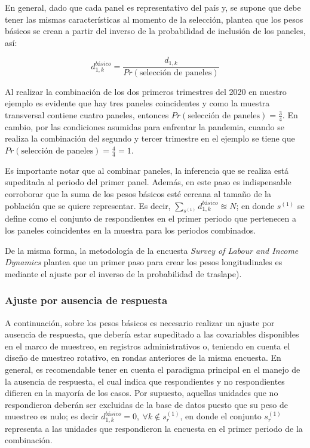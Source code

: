 \documentclass[
  12pt,
]{book}
\begin{document}
En general, dado que cada panel es representativo del país y, se supone que debe tener las mismas características al momento de la selección, \citet{LaRoche_2003} plantea que los pesos básicos se crean a partir del inverso de la probabilidad de inclusión de los paneles, así:

\[
d_{1, k}^{básico} = \frac{d_{1, k}}{Pr(\text{selección de paneles})}
\]

Al realizar la combinación de los dos primeros trimestres del 2020 en nuestro ejemplo es evidente que hay tres paneles coincidentes y como la muestra transversal contiene cuatro paneles, entonces \(Pr(\text{selección de paneles}) = \frac{3}{4}\). En cambio, por las condiciones asumidas para enfrentar la pandemia, cuando se realiza la combinación del segundo y tercer trimestre en el ejemplo se tiene que \(Pr(\text{selección de paneles}) = \frac{4}{4} = 1\).

Es importante notar que al combinar paneles, la inferencia que se realiza está supeditada al periodo del primer panel. Además, en este paso es indispensable corroborar que la suma de los pesos básicos esté cercana al tamaño de la población que se quiere representar. Es decir, \(\sum_{s^{(1)}} d_{1, k}^{básico} \approxeq N\); en donde \(s^{(1)}\) se define como el conjunto de respondientes en el primer periodo que pertenecen a los paneles coincidentes en la muestra para los periodos combinados.

De la misma forma, la metodología de la
encuesta \emph{Survey of Labour and Income Dynamics} \citep{Naud_2002, LaRoche_2003} plantea que un primer paso para crear los pesos longitudinales es mediante el ajuste por el inverso de la probabilidad de traslape).

\hypertarget{ajuste-por-ausencia-de-respuesta-1}{%
\subsubsection{Ajuste por ausencia de respuesta}\label{ajuste-por-ausencia-de-respuesta-1}}

A continuación, sobre los pesos básicos es necesario realizar un ajuste por ausencia de respuesta, que debería estar supeditado a las covariables disponibles en el marco de muestreo, en registros administrativos o, teniendo en cuenta el diseño de muestreo rotativo, en rondas anteriores de la misma encuesta. En general, es recomendable tener en cuenta el paradigma principal en el manejo de la ausencia de respuesta, el cual indica que respondientes y no respondientes difieren en la mayoría de los casos. Por supuesto, aquellas unidades que no respondieron deberán ser excluidas de la base de datos puesto que su peso de muestreo es nulo; es decir \(d_{1, k}^{básico} = 0, \ \forall k \notin s_r^{(1)}\), en donde el conjunto \(s_r^{(1)}\) representa a las unidades que respondieron la encuesta en el primer periodo de la combinación.
\end{document}
